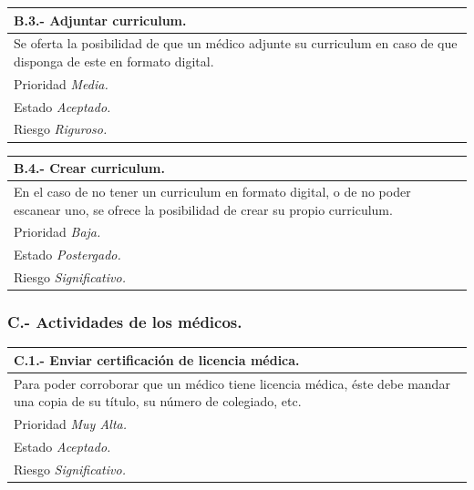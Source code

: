 \documentclass[a4paper,oneside,11pt]{book}
\begin{document}
\begin{center}
\begin{tabulary}{15cm}{|L|}
	\hline
		\bf{B.3.- Adjuntar curriculum.} \\
	\hline
		Se oferta la posibilidad de que un médico adjunte su curriculum en caso de que disponga de este en formato digital. \\ 
	\hline
		Prioridad \textit{Media.} \\
	\hline
		Estado \textit{Aceptado.} \\
	\hline
		Riesgo \textit{Riguroso.} \\
	\hline
\end{tabulary}
\end{center}

\begin{center}
\begin{tabulary}{15cm}{|L|}
	\hline
		\bf{B.4.- Crear curriculum.} \\
	\hline
		En el caso de no tener un curriculum en formato digital, o de no poder escanear uno, se ofrece la posibilidad de crear su propio curriculum. \\
	\hline
		Prioridad \textit{Baja.} \\
	\hline
		Estado \textit{Postergado.} \\
	\hline
		Riesgo \textit{Significativo.} \\
	\hline
\end{tabulary}
\end{center}


\subsubsection{C.- Actividades de los médicos.}

\begin{center}
\begin{tabulary}{15cm}{|L|}
	\hline
		\bf{C.1.- Enviar certificación de licencia médica.} \\
	\hline
		Para poder corroborar que un médico tiene licencia médica, éste debe mandar una copia de su título, su número de colegiado, etc. \\
	\hline
		Prioridad \textit{Muy Alta.} \\
	\hline
		Estado \textit{Aceptado.} \\
	\hline
		Riesgo \textit{Significativo.} \\
	\hline
\end{tabulary}
\end{center}
\end{document}
